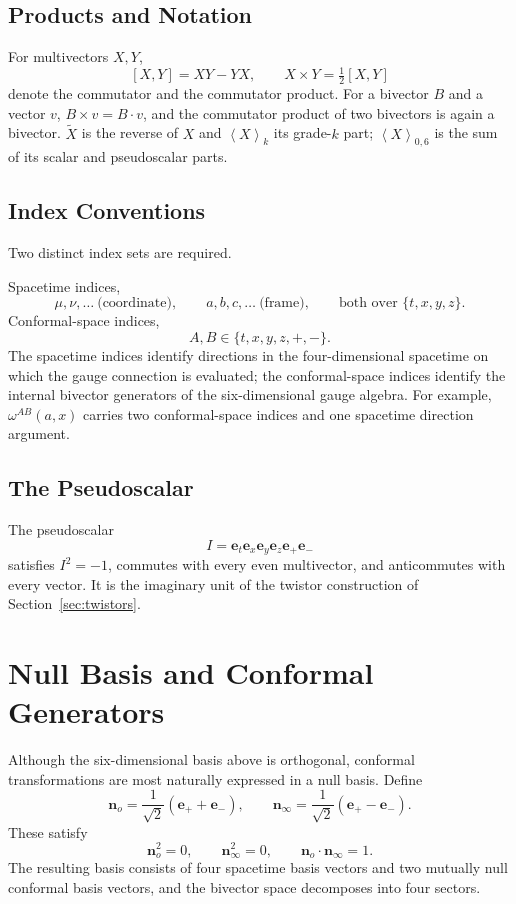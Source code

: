 \documentclass[11pt,a4paper]{article}
\newcommand{\nzero}{\mathbf{n}_o}
\newcommand{\ninf}{\mathbf{n}_\infty}
\newcommand{\e}{\mathbf{e}}
\newcommand{\cross}{\mathbin{\times}}
\newcommand{\rev}[1]{\widetilde{#1}}
\newcommand{\grade}[2]{\left\langle #1\right\rangle_{#2}}
\begin{document}
\subsection{Products and Notation}

For multivectors \(X,Y\),
\[
    [X,Y]=XY-YX,
    \qquad
    X\cross Y=\tfrac12[X,Y]
\]
denote the commutator and the commutator product. For a bivector \(B\)
and a vector \(v\), \(B\cross v=B\cdot v\), and the commutator product
of two bivectors is again a bivector. \(\rev{X}\) is the reverse of
\(X\) and \(\grade{X}{k}\) its grade-\(k\) part;
\(\grade{X}{0,6}\) is the sum of its scalar and pseudoscalar parts.

\subsection{Index Conventions}

Two distinct index sets are required.

Spacetime indices,
\[
    \mu,\nu,\ldots\ \text{(coordinate)},\qquad
    a,b,c,\ldots\ \text{(frame)},\qquad
    \text{both over }\{t,x,y,z\}.
\]
Conformal-space indices,
\[
    A,B\in\{t,x,y,z,+,-\}.
\]
The spacetime indices identify directions in the four-dimensional
spacetime on which the gauge connection is evaluated; the
conformal-space indices identify the internal bivector generators of
the six-dimensional gauge algebra. For example, \(\omega^{AB}(a,x)\)
carries two conformal-space indices and one spacetime direction
argument.

\subsection{The Pseudoscalar}

The pseudoscalar
\[
    I=\e_t\e_x\e_y\e_z\e_+\e_-
\]
satisfies \(I^2=-1\), commutes with every even multivector, and
anticommutes with every vector. It is the imaginary unit of the
twistor construction of Section~\ref{sec:twistors}.

\section{Null Basis and Conformal Generators}

Although the six-dimensional basis above is orthogonal, conformal
transformations are most naturally expressed in a null basis. Define
\[
    \boxed{
        \nzero=\frac{1}{\sqrt{2}}\left(\e_++\e_-\right),
        \qquad
        \ninf=\frac{1}{\sqrt{2}}\left(\e_+-\e_-\right).
    }
\]
These satisfy
\[
    \nzero^2=0,\qquad
    \ninf^2=0,\qquad
    \nzero\cdot\ninf=1.
\]
The resulting basis consists of four spacetime basis vectors and two
mutually null conformal basis vectors, and the bivector space
decomposes into four sectors.
\end{document}
